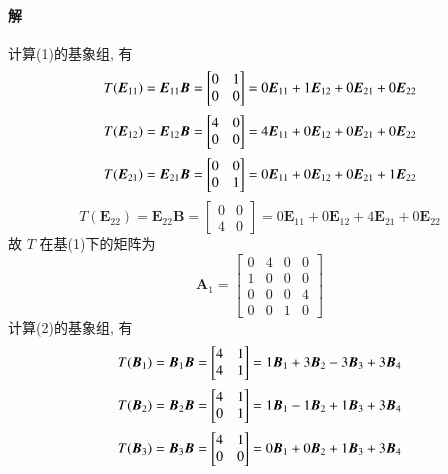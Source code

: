 \paragraph*{解} 计算(1)的基象组, 有
$$
    T(\bm{E}_{11}) = \bm{E}_{11}\bm{B} = \begin{bmatrix}
        0 & 1 \\
        0 & 0
    \end{bmatrix} = 0 \bm{E}_{11} + 1 \bm{E}_{12} + 0 \bm{E}_{21} + 0 \bm{E}_{22} \\
$$
$$
    T(\bm{E}_{12}) = \bm{E}_{12}\bm{B} = \begin{bmatrix}
        4 & 0 \\
        0 & 0
    \end{bmatrix} = 4 \bm{E}_{11} + 0 \bm{E}_{12} + 0 \bm{E}_{21} + 0 \bm{E}_{22} \\
$$
$$
    T(\bm{E}_{21}) = \bm{E}_{21}\bm{B} = \begin{bmatrix}
        0 & 0 \\
        0 & 1
    \end{bmatrix} = 0 \bm{E}_{11} + 0 \bm{E}_{12} + 0 \bm{E}_{21} + 1 \bm{E}_{22} \\
$$
$$
    T(\bm{E}_{22}) = \bm{E}_{22}\bm{B} = \begin{bmatrix}
        0 & 0 \\
        4 & 0
    \end{bmatrix} = 0 \bm{E}_{11} + 0 \bm{E}_{12} + 4 \bm{E}_{21} + 0 \bm{E}_{22}
$$
故 $T$ 在基(1)下的矩阵为
$$
    \bm{A}_1 = \begin{bmatrix}
        0 & 4 & 0 & 0 \\
        1 & 0 & 0 & 0 \\
        0 & 0 & 0 & 4 \\
        0 & 0 & 1 & 0
    \end{bmatrix}
$$
计算(2)的基象组, 有
$$
    T(\bm{B}_{1}) = \bm{B}_{1}\bm{B} = \begin{bmatrix}
        4 & 1 \\
        4 & 1
    \end{bmatrix} = 1 \bm{B}_{1} + 3 \bm{B}_{2} - 3 \bm{B}_{3} + 3 \bm{B}_{4} \\
$$
$$
    T(\bm{B}_{2}) = \bm{B}_{2}\bm{B} = \begin{bmatrix}
        4 & 1 \\
        0 & 1
    \end{bmatrix} = 1 \bm{B}_{1} - 1 \bm{B}_{2} + 1 \bm{B}_{3} + 3 \bm{B}_{4} \\
$$
$$
    T(\bm{B}_{3}) = \bm{B}_{3}\bm{B} = \begin{bmatrix}
        4 & 1 \\
        0 & 0
    \end{bmatrix} = 0 \bm{B}_{1} + 0 \bm{B}_{2} + 1 \bm{B}_{3} + 3 \bm{B}_{4} \\
$$

